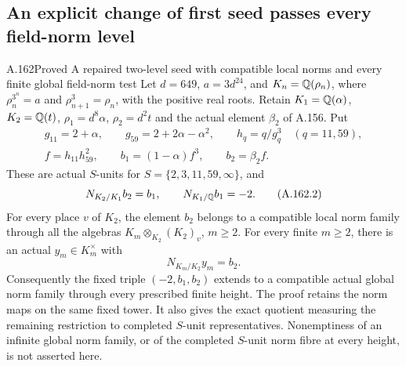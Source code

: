 \subsection{An explicit change of first seed passes every field-norm level}

\begin{statement}{A.162}{Proved}
{A repaired two-level seed with compatible local norms and every finite global field-norm test}
Let \(d=649\), \(a=3d^{24}\), and
\(K_n=\mathbb Q(\rho_n)\), where \(\rho_n^{3^n}=a\) and
\(\rho_{n+1}^3=\rho_n\), with the positive real roots.
Retain \(K_1=\mathbb Q(\alpha)\), \(K_2=\mathbb Q(t)\),
\(\rho_1=d^8\alpha\), \(\rho_2=d^2t\) and the actual element
\(\beta_2\) of A.156.  Put
\[
 \begin{gathered}
 g_{11}=2+\alpha,\qquad g_{59}=2+2\alpha-\alpha^2,
 \qquad h_q=q/g_q^3\quad(q=11,59),\\
 f=h_{11}h_{59}^{2},\qquad
 b_1=(1-\alpha)f^3,\qquad b_2=\beta_2 f.
 \end{gathered}
\tag{A.162.1}
\]
These are actual \(S\)-units for \(S=\{2,3,11,59,\infty\}\), and
\[
       N_{K_2/K_1}b_2=b_1,\qquad N_{K_1/\mathbb Q}b_1=-2.
\tag{A.162.2}
\]
For every place \(v\) of \(K_2\), the element \(b_2\) belongs to a
compatible local norm family through all the algebras
\(K_m\otimes_{K_2}(K_2)_v\), \(m\geq2\).
For every finite \(m\geq2\), there is an actual
\(y_m\in K_m^\times\) with
\[
                         N_{K_m/K_2}y_m=b_2.
\tag{A.162.3}
\]
Consequently the fixed triple \((-2,b_1,b_2)\) extends to a compatible
actual global norm family through every prescribed finite height.
The proof retains the norm maps on the same fixed tower.
It also gives the exact quotient measuring the remaining restriction to
completed \(S\)-unit representatives.  Nonemptiness of an infinite global
norm family, or of the completed \(S\)-unit norm fibre at every height,
is not asserted here.
\end{statement}

